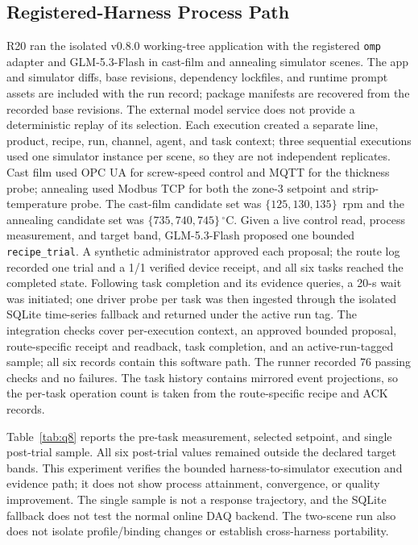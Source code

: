 \subsection{Registered-Harness Process Path}
\label{sec:harness-e2e}
R20 ran the isolated v0.8.0 working-tree application with the registered
\texttt{omp} adapter and GLM-5.3-Flash in cast-film and annealing simulator
scenes. The app and simulator diffs, base revisions, dependency lockfiles, and
runtime prompt assets are included with the run record; package manifests are
recovered from the recorded base revisions. The external model service does
not provide a deterministic replay of its selection. Each execution created
a separate line, product, recipe, run, channel, agent, and task context; three
sequential executions used one simulator
instance per scene, so they are not independent replicates. Cast film used
OPC UA for screw-speed control and MQTT for the thickness probe; annealing
used Modbus TCP for both the zone-3 setpoint and strip-temperature probe.
The cast-film candidate set was $\{125,130,135\}$~rpm and the annealing
candidate set was $\{735,740,745\}\,^{\circ}$C. Given a live control read,
process measurement, and target band, GLM-5.3-Flash proposed one bounded
\texttt{recipe\_trial}. A synthetic administrator approved each proposal;
the route log recorded one trial and a 1/1 verified device receipt, and all
six tasks reached the completed state. Following task completion and its
evidence queries, a 20-s wait was initiated; one driver probe per task was
then ingested through the isolated SQLite time-series fallback and returned
under the active run tag. The integration checks cover per-execution context, an approved bounded
proposal, route-specific receipt and readback, task completion, and an
active-run-tagged sample; all six records contain this software path. The
runner recorded 76 passing checks and no failures. The task history contains
mirrored event projections, so the per-task operation count is taken from the
route-specific recipe and ACK records.

Table~\ref{tab:q8} reports the pre-task measurement, selected setpoint, and
single post-trial sample. All six post-trial values remained outside the
declared target bands. This experiment verifies the bounded
harness-to-simulator execution and evidence path; it does not show process
attainment, convergence, or quality improvement. The single sample is not a
response trajectory, and the SQLite fallback does not test the normal online
DAQ backend. The two-scene run also does not isolate profile/binding changes
or establish cross-harness portability.

